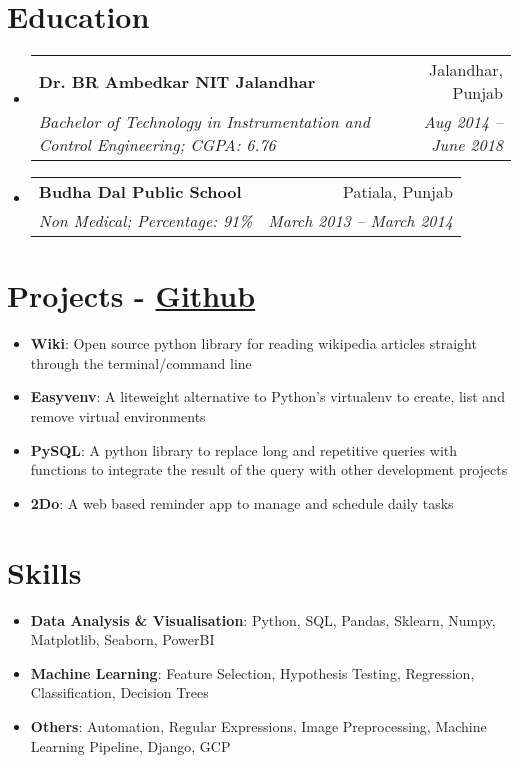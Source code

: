 \documentclass[letterpaper,11pt]{article}
\makeatletter
\newcommand{\resumeSubheading}[4]{
  \vspace{-1pt}\item
    \begin{tabular*}{0.97\textwidth}[t]{l@{\extracolsep{\fill}}r}
      \textbf{#1} & #2 \\
      \textit{\small#3} & \textit{\small #4} \\
    \end{tabular*}\vspace{-5pt}
}
\newcommand{\resumeSubHeadingListStart}{\begin{itemize}[leftmargin=*]}
\newcommand{\resumeSubHeadingListEnd}{\end{itemize}}
\makeatother
\begin{document}
\section{Education}
  \resumeSubHeadingListStart
    \resumeSubheading
      {Dr. BR Ambedkar NIT Jalandhar}{Jalandhar, Punjab}
      {Bachelor of Technology in Instrumentation and Control Engineering;  CGPA: 6.76}{Aug 2014 -- June 2018}
    \resumeSubheading
      {Budha Dal Public School}{Patiala, Punjab}
      {Non Medical; Percentage: 91\%}{March 2013 -- March 2014}
  \resumeSubHeadingListEnd

\section{Projects - \href{https://github.com/adarsh9780}{Github}}
  \resumeSubHeadingListStart
    \item{
      \textbf{Wiki}{: Open source python library for reading wikipedia articles straight through the terminal/command line}
      \hfill
    }
    \item{
      \textbf{Easyvenv}{: A liteweight alternative to Python's virtualenv to create, list and remove virtual environments}
      \hfill
    }
    \item{
      \textbf{PySQL}{: A python library to replace long and repetitive queries with functions to integrate the result of the query with other development projects}
      \hfill
    }
    \item{
      \textbf{2Do}{: A web based reminder app to manage and schedule daily tasks}
      \hfill
    }
  \resumeSubHeadingListEnd

%
\section{Skills}
  \resumeSubHeadingListStart
    \item{
      \textbf{Data Analysis \& Visualisation}{: Python, SQL, Pandas, Sklearn, Numpy, Matplotlib, Seaborn, PowerBI}
      \hfill
    }
    \item{
      \textbf{Machine Learning}{: Feature Selection, Hypothesis Testing, Regression, Classification, Decision Trees}
      \hfill
    }
    \item{
      \textbf{Others}{: Automation, Regular Expressions, Image Preprocessing, Machine Learning Pipeline, Django, GCP}
      \hfill
    }
  \resumeSubHeadingListEnd
\end{document}
